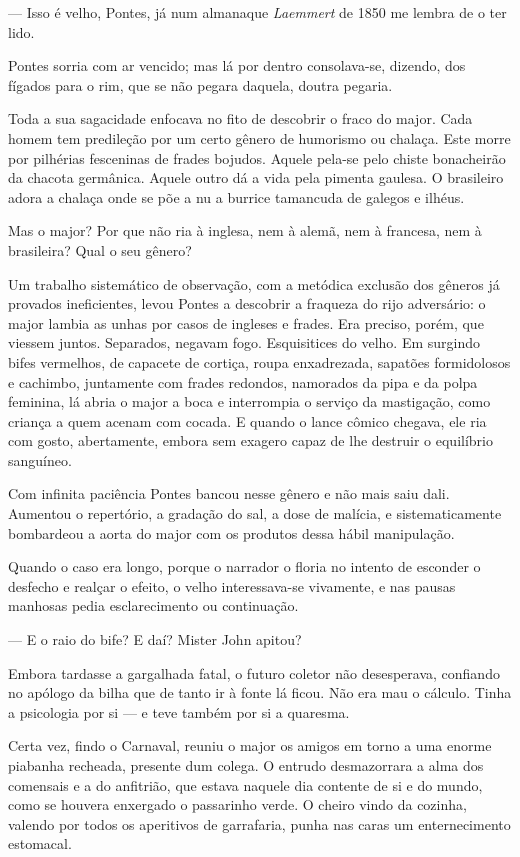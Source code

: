 --- Isso é velho, Pontes, já num almanaque \emph{Laemmert} de 1850 me
lembra de o ter lido.

Pontes sorria com ar vencido; mas lá por dentro consolava-se, dizendo,
dos fígados para o rim, que se não pegara daquela, doutra pegaria.

Toda a sua sagacidade enfocava no fito de descobrir o fraco do major.
Cada homem tem predileção por um certo gênero de humorismo ou chalaça.
Este morre por pilhérias fesceninas de frades bojudos. Aquele pela-se
pelo chiste bonacheirão da chacota germânica. Aquele outro dá a vida
pela pimenta gaulesa. O brasileiro adora a chalaça onde se põe a nu a
burrice tamancuda de galegos e ilhéus.

Mas o major? Por que não ria à inglesa, nem à alemã, nem à francesa, nem
à brasileira? Qual o seu gênero?

Um trabalho sistemático de observação, com a metódica exclusão dos
gêneros já provados ineficientes, levou Pontes a descobrir a fraqueza do
rijo adversário: o major lambia as unhas por casos de ingleses e frades.
Era preciso, porém, que viessem juntos. Separados, negavam fogo.
Esquisitices do velho. Em surgindo bifes vermelhos, de capacete de
cortiça, roupa enxadrezada, sapatões formidolosos e cachimbo, juntamente
com frades redondos, namorados da pipa e da polpa feminina, lá abria o
major a boca e interrompia o serviço da mastigação, como criança a quem
acenam com cocada. E quando o lance cômico chegava, ele ria com gosto,
abertamente, embora sem exagero capaz de lhe destruir o equilíbrio
sanguíneo.

Com infinita paciência Pontes bancou nesse gênero e não mais saiu dali.
Aumentou o repertório, a gradação do sal, a dose de malícia, e
sistematicamente bombardeou a aorta do major com os produtos dessa hábil
manipulação.

Quando o caso era longo, porque o narrador o floria no intento de
esconder o desfecho e realçar o efeito, o velho interessava-se
vivamente, e nas pausas manhosas pedia esclarecimento ou continuação.

--- E o raio do bife? E daí? Mister John apitou?

Embora tardasse a gargalhada fatal, o futuro coletor não desesperava,
confiando no apólogo da bilha que de tanto ir à fonte lá ficou. Não era
mau o cálculo. Tinha a psicologia por si --- e teve também por si a
quaresma.

Certa vez, findo o Carnaval, reuniu o major os amigos em torno a uma
enorme piabanha recheada, presente dum colega. O entrudo desmazorrara a
alma dos comensais e a do anfitrião, que estava naquele dia contente de
si e do mundo, como se houvera enxergado o passarinho verde. O cheiro
vindo da cozinha, valendo por todos os aperitivos de garrafaria, punha
nas caras um enternecimento estomacal.

